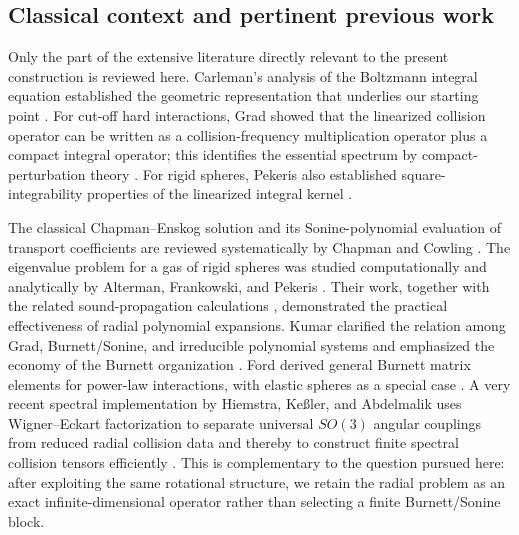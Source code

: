 \documentclass[11pt]{article}
\numberwithin{equation}{section}
\theoremstyle{definition}
\begin{document}
\subsection{Classical context and pertinent previous work}

Only the part of the extensive literature directly relevant to the present
construction is reviewed here.  Carleman's analysis of the Boltzmann integral
equation established the geometric representation that underlies our starting
point \cite{Carleman1933}.  For cut-off hard interactions, Grad showed that the
linearized collision operator can be written as a collision-frequency
multiplication operator plus a compact integral operator; this identifies the
essential spectrum by compact-perturbation theory
\cite{GradRarefied1949,Grad1963,Drange1975}.  For rigid spheres, Pekeris also
established square-integrability properties of the linearized integral kernel
\cite{Pekeris1963}.

The classical Chapman--Enskog solution and its Sonine-polynomial evaluation of
transport coefficients are reviewed systematically by Chapman and Cowling
\cite{ChapmanCowling1970}.  The eigenvalue problem for a gas of rigid spheres
was studied computationally and analytically by Alterman, Frankowski, and
Pekeris \cite{AltermanFrankowskiPekeris1962}.  Their work, together with the
related sound-propagation calculations \cite{PekerisEtAl1962}, demonstrated
the practical effectiveness of radial polynomial expansions.  Kumar clarified
the relation among Grad, Burnett/Sonine, and irreducible polynomial systems
and emphasized the economy of the Burnett organization \cite{Kumar1966}.
Ford derived general Burnett matrix elements for power-law interactions, with
elastic spheres as a special case \cite{Ford1968}.  A very recent spectral
implementation by Hiemstra, Ke\ss ler, and Abdelmalik uses Wigner--Eckart
factorization to separate universal $SO(3)$ angular couplings from reduced
radial collision data and thereby to construct finite spectral collision
tensors efficiently \cite{HiemstraEtAl2026}.  This is complementary to the
question pursued here: after exploiting the same rotational structure, we
retain the radial problem as an exact infinite-dimensional operator rather
than selecting a finite Burnett/Sonine block.
\end{document}
